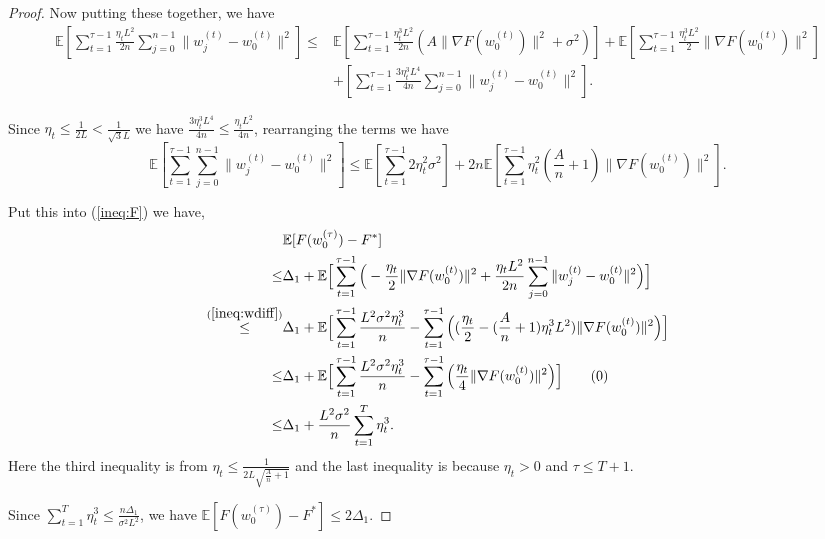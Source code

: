 \documentclass{article} %
\theoremstyle{plain}
\theoremstyle{definition}
\theoremstyle{remark}
\begin{document}
\begin{proof}
    Now putting these together, we have 
    \begin{align*}
    \mathbb{E}[\sum_{t=1}^{\tau-1}\frac{\eta_t L^2}{2n}\sum_{j=0}^{n-1} \|w^{(t)}_j-w^{(t)}_0\|^2]\leq & \mathbb{E}[\sum_{t=1}^{\tau-1}\frac{\eta_t^3 L^2}{2n}(A\|\nabla F(w^{(t)}_0)\|^2+\sigma^2)]+\mathbb{E}[\sum_{t=1}^{\tau-1}\frac{\eta_t^3 L^2}{2}\|\nabla F(w^{(t)}_0)\|^2]\\
    & +[\sum_{t=1}^{\tau-1}\frac{3\eta_t^3 L^4}{4n}\sum_{j=0}^{n-1}\|w^{(t)}_j-w^{(t)}_0\|^2].
    \end{align*}

    Since $\eta_t\leq\frac{1}{2L}<\frac{1}{\sqrt{3}L}$ we have $\frac{3\eta_t^3 L^4}{4n}\leq \frac{\eta_t L^2}{4n}$, rearranging the terms we have 
    \begin{equation}
    \mathbb{E}[\sum_{t=1}^{\tau-1}\sum_{j=0}^{n-1} \|w^{(t)}_j-w^{(t)}_0\|^2]\leq \mathbb{E}[\sum_{t=1}^{\tau-1}2\eta_t^2\sigma^2]+2n\mathbb{E}[\sum_{t=1}^{\tau-1}\eta_t^2(\frac{A}{n}+1)\|\nabla F(w^{(t)}_0)\|^2]. \label{ineq:wdiff}
    \end{equation}

    Put this into (\ref{ineq:F}) we have, 
    \begin{align*}
        & \mathbb{E}[F(w^{(\tau)}_0)-F^*] \\
        \leq & \Delta_1+\mathbb{E}\Big[\sum_{t=1}^{\tau-1} \Big(-\frac{\eta_t}{2}\|\nabla F(w^{(t)}_0)\|^2+\frac{\eta_t L^2}{2n}\sum_{j=0}^{n-1} \|w^{(t)}_j-w^{(t)}_0\|^2\Big)\Big] \\
        \overset{(\ref{ineq:wdiff})}{\leq} & \Delta_1+\mathbb{E}\Big[\sum_{t=1}^{\tau-1}\frac{L^2\sigma^2\eta_t^3}{n}-\sum_{t=1}^{\tau-1}\Big((\frac{\eta_t}{2}-(\frac{A}{n}+1)\eta_t^3 L^2)\|\nabla F(w^{(t)}_0)\|^2\Big)\Big] \\
        \leq & \Delta_1+\mathbb{E}\Big[\sum_{t=1}^{\tau-1} \frac{L^2\sigma^2\eta_t^3}{n}-\sum_{t=1}^{\tau-1}\Big(\frac{\eta_t}{4}\|\nabla F(w^{(t)}_0)\|^2\Big)\Big] \tag{\theequation}\stepcounter{equation}\label{eq:expectation} \\
        \leq & \Delta_1+\frac{L^2\sigma^2}{n}\sum_{t=1}^T \eta_t^3.
    \end{align*}
    Here the third inequality is from $\eta_t\leq \frac{1}{2L\sqrt{\frac{A}{n}+1}}$ and the last inequality is because $\eta_t>0$ and $\tau\leq T+1$.
    
    Since $\sum_{t=1}^T \eta_t^3 \leq\frac{n\Delta_1}{\sigma^2 L^2}$, we have 
    $\mathbb{E}[F(w^{(\tau)}_0)-F^*]\leq 2\Delta_1.$
\end{proof}
\end{document}
